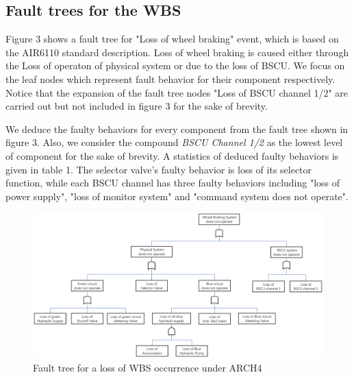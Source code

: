 \documentclass[conference]{IEEEtran}
\begin{document}
\subsection{Fault trees for the WBS}
Figure 3 shows a fault tree for "Loss of wheel braking" event, which is based on the AIR6110 standard description. Loss of wheel braking is caused either through the Loss of operaton of physical system or due to the loss of BSCU. We focus on the leaf nodes which represent fault behavior for their component respectively. Notice that the expansion of the fault tree nodes "Loss of BSCU channel 1/2" are carried out but not included in figure 3 for the sake of brevity. 

We deduce the faulty behaviors for every component from the fault tree shown in figure 3. Also, we consider the compound \emph{BSCU Channel 1/2} as the lowest level of component for the sake of brevity. A statistics of deduced faulty behaviors is given in table 1. The selector valve's faulty behavior is loss of its selector function, while each BSCU channel has three faulty behaviors including "loss of power supply", "loss of monitor system" and "command system does not operate".

\begin{figure}[hb]
	\centerline{\includegraphics[width=165mm]{figure/fault_tree.eps}}
	\caption{Fault tree for a loss of WBS occurrence under ARCH4}
	\label{WBS_BIP_Nominal}
\end{figure}
\end{document}
